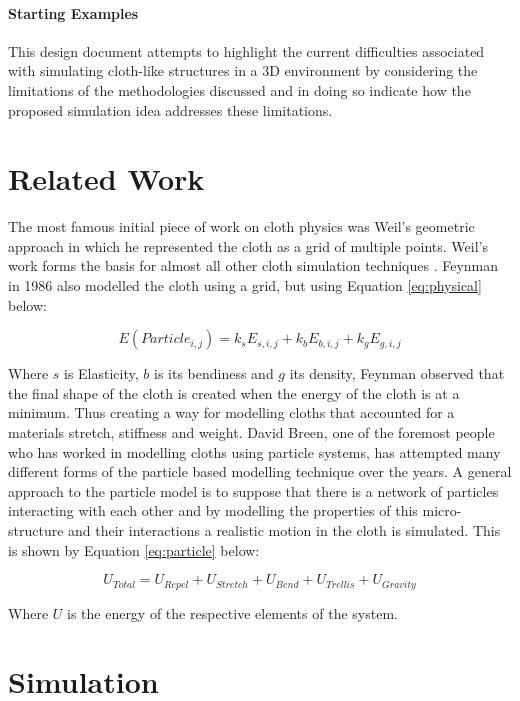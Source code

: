 \documentclass[conference,backref=page]{acmsiggraph}
\begin{document}
	\paragraph{Starting Examples}
	This design document attempts to highlight the current difficulties associated with simulating cloth-like structures in a 3D environment by considering the limitations of the methodologies discussed and in doing so indicate how the proposed simulation idea addresses these limitations.
	
	
	\section{Related Work}
	The most famous initial piece of work on cloth physics was Weil's geometric approach \cite{Weil} in which he represented the cloth as a grid of multiple points. Weil's work forms the basis for almost all other cloth simulation techniques \cite{Karthikeyan}. Feynman in 1986 also modelled the cloth using a grid, but using Equation \ref{eq:physical} below:
	
	\begin{equation} \label{eq:physical}
		E(Particle_{i,j}) = k_{s}E_{s,i,j} + k_{b}E_{b,i,j} + k_{g}E_{g,i,j}
	\end{equation}
	
	Where $s$ is Elasticity, $b$ is its bendiness and $g$ its density, Feynman observed that the final shape of the cloth is created when the energy of the cloth is at a minimum. Thus creating a way for modelling cloths that accounted for a materials stretch, stiffness and weight. David Breen, one of the foremost people who has worked in modelling cloths using particle systems, has attempted many different forms of the particle based modelling technique over the years. A general approach to the particle model is to suppose that there is a network of particles interacting with each other and by modelling the properties of this micro-structure and their interactions a realistic motion in the cloth is simulated. This is shown by Equation \ref{eq:particle} below:
	
	\begin{equation} \label{eq:particle}
		U_{Total} = U_{Repel} + U_{Stretch} + U_{Bend} + U_{Trellis} + U_{Gravity}
	\end{equation}
	
	Where $U$ is the energy of the respective elements of the system.
	
	\section{Simulation}
	
\end{document}
